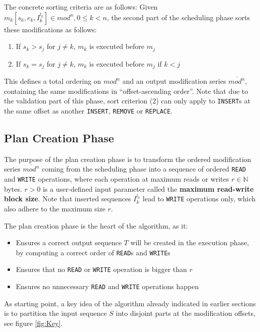 \documentclass[english, 10pt, openright, twocolumn, landscape, twoside, notitlepage, a4paper, pdftex]		
{article}
\begin{document}
The concrete sorting criteria are as follows: Given $m_{k}[s_{k},e_{k},I_{k}^{l_{k}}]\in mod^{n}, 0\leq k< n$, the second part of the scheduling phase sorts these modifications as follows:
\begin{enumerate}
\item If $s_{k}>s_{j}$ for $j\neq k$, $m_{k}$ is executed before $m_{j}$
\item If $s_{k}=s_{j}$ for $j\neq k$, $m_{k}$ is executed before $m_{j}$ if $k<j$
\end{enumerate}

This defines a total ordering on $mod^{n}$ and an output modification series $\overline{mod^{n}}$, containing the same modifications in ``offset-ascending order''. Note that due to the validation part of this phase, sort criterion (2) can only apply to \texttt{INSERT}s at the same offset as another \texttt{INSERT}, \texttt{REMOVE} or \texttt{REPLACE}.

\subsection{Plan Creation Phase}%
\label{sec:PlanCreationPhase}%

The purpose of the plan creation phase is to transform the ordered modification series $\overline{mod^{n}}$ coming from the scheduling phase into a sequence of ordered \texttt{READ} and \texttt{WRITE} operations, where each operation at maximum reads or writes $r\in\mathbb{N}$ bytes. $r>0$ is a user-defined input parameter called the \textbf{maximum read-write block size}. Note that inserted sequences $I_{k}^{l_{k}}$ lead to \texttt{WRITE} operations only, which also adhere to the maximum size $r$.

The plan creation phase is the heart of the algorithm, as it:
\begin{itemize}
\item Ensures a correct output sequence $T$ will be created in the execution phase, by computing a correct order of \texttt{READ}s and \texttt{WRITE}s
\item Ensures that no \texttt{READ} or \texttt{WRITE} operation is bigger than $r$
\item Ensures no unnecessary \texttt{READ} and \texttt{WRITE} operations happen
\end{itemize}

As starting point, a key idea of the algorithm already indicated in earlier sections is to partition the input sequence $S$ into disjoint parts at the modification offsets, see figure \ref{fig:Key}.
\end{document}
